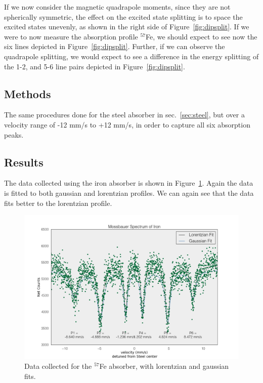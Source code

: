 \documentclass[paper=a4, fontsize=11pt, abstract=on]{scrartcl} %
\numberwithin{equation}{section}
\numberwithin{figure}{section}
\numberwithin{table}{section}
\begin{document}
\vline

If we now consider the magnetic quadrapole moments, since they are not
spherically symmetric, the effect on the excited state splitting is to
space the excited states unevenly, as shown in the right side of
Figure~\ref{fig:dipsplit}. If we were to now measure the absorption
profile $^{57}$Fe, we should expect to see now the six lines depicted
in Figure~\ref{fig:dipsplit}. Further, if we can observe the
quadrapole splitting, we would expect to see a difference in the
energy splitting of the 1-2,  and 5-6 line pairs depicted in Figure~\ref{fig:dipsplit}.

\subsection{Methods}
\label{sec:irmeth}

The same procedures done for the steel absorber in
sec.~\ref{sec:steel}, but over a velocity range of -12 mm/s to +12
mm/s, in order to capture all six absorption peaks.

\subsection{Results}
\label{sec:irres}

The data collected using the iron absorber is shown in
Figure~\ref{fig:iron}. Again the data is fitted to both gaussian and
lorentzian profiles. We can again see that the data fits better to the
lorentzian profile. 

\begin{figure}[h]
  \centering
  \includegraphics[width=.9\textwidth]{ironfit}
  \caption{Data collected for the $^{57}$Fe absorber, with lorentzian and gaussian fits.}
  \label{fig:iron}
\end{figure}
\end{document}
